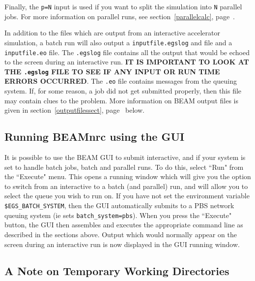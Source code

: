 \documentclass[12pt,twoside]{article}
\begin{document}
Finally, the {\tt p=N} input is used if you want to split the simulation
into {\tt N} parallel jobs.  For more information on parallel runs,
see section~\ref{parallelcalc}, page~\pageref{parallelcalc}.

In addition to the files which are output from an interactive accelerator
simulation, a batch run will also output a {\tt inputfile.egslog} and
file and a
{\tt inputfile.eo} file.  The {\tt .egslog} file contains all the output
that would be echoed to the screen during an interactive run.  {\bfseries
IT IS IMPORTANT
TO LOOK AT THE {\tt .egslog} FILE TO SEE IF ANY INPUT OR RUN TIME ERRORS
OCCURRED}.  The {\tt .eo} file contains messages from the queuing system.  If,
for some reason, a job did not get submitted properly, then this file may
contain clues to the problem.  More information on BEAM output files is given
in section~\ref{outputfilessect}, page~\pageref{outputfilessect} below.

\subsection{Running BEAMnrc using the GUI}

It is possible to use the BEAM GUI to submit interactive, and if your
system is set to handle batch jobs, batch and parallel runs.  To do this,
select ``Run" from the ``Execute" menu.  This opens a running window which
will give you the option to switch from an interactive to a batch (and
parallel) run, and will allow you to select the queue you wish to run on.
If you have not set the environment variable {\tt \$EGS\_BATCH\_SYSTEM},
then the GUI automatically submits to a PBS network queuing system (ie
sets {\tt batch\_system=pbs}).  When you press the ``Execute" button, the
GUI then assembles and executes the appropriate command line as described
in the sections above.  Output which would normally appear on the screen
during an interactive run is now displayed in the GUI running window.

\subsection{A Note on Temporary Working Directories}
\label{twdsect}
\end{document}
